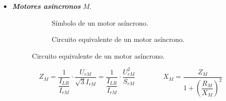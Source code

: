 \begin{itemize}
            \item \textbf{\textit{Motores asíncronos}} $M$.
                \begin{figure}[H]
                    \begin{minipage}{0.5\textwidth}
                        \begin{figure}[H]
                            \centering
                            \caption{Símbolo de un motor asíncrono.}
                            \label{fig:motorSimbolo}
                        \end{figure}
                    \end{minipage}%
                    \begin{minipage}{0.5\textwidth}
                        \begin{figure}[H]
                            \centering
                            \caption{Circuito equivalente de un motor asíncrono.}
                            \label{fig:motorCto}
                        \end{figure}
                    \end{minipage}%
                \end{figure}

                \begin{equation}
                    Z_\textit{M} = \dfrac{1}{\dfrac{I_\textit{LR}}{I_\textit{rM}}}\cdot \dfrac{U_\textit{rM}}{\sqrt{3}I_\textit{rM}} = \dfrac{1}{\dfrac{I_\textit{LR}}{I_\textit{rM}}}\cdot \dfrac{U_\textit{rM}^2}{S_\textit{rM}} \qquad\qquad X_\textit{M} = \dfrac{Z_\textit{M}}{1+\left(\dfrac{R_\textit{M}}{X_\textit{M}}\right)^2}
                \end{equation}


\end{itemize}
